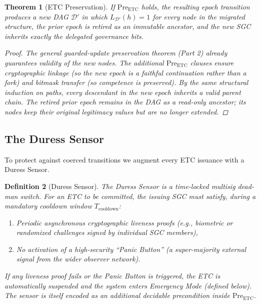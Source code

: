 \documentclass[11pt,a4paper]{article}
\newtheorem{theorem}{Theorem}[section]
\newtheorem{definition}[theorem]{Definition}
\begin{document}
\begin{theorem}[ETC Preservation]
If \(\text{Pre}_{\text{ETC}}\) holds, the resulting epoch transition produces a new DAG \(\mathcal{D}'\) in which \(L_{\mathcal{D}'}(h) = 1\) for every node in the migrated structure, the prior epoch is retired as an immutable ancestor, and the new SGC inherits exactly the delegated governance bits.

\begin{proof}
The general guarded-update preservation theorem (Part 2) already guarantees validity of the new nodes. The additional \(\text{Pre}_{\text{ETC}}\) clauses ensure cryptographic linkage (so the new epoch is a faithful continuation rather than a fork) and bitmask transfer (so competence is preserved). By the same structural induction on paths, every descendant in the new epoch inherits a valid parent chain. The retired prior epoch remains in the DAG as a read-only ancestor; its nodes keep their original legitimacy values but are no longer extended.
\end{proof}
\end{theorem}

\subsection{The Duress Sensor}

To protect against coerced transitions we augment every ETC issuance with a Duress Sensor.

\begin{definition}[Duress Sensor]
The Duress Sensor is a time-locked multisig dead-man switch. For an ETC to be committed, the issuing SGC must satisfy, during a mandatory cooldown window \(T_{\text{cooldown}}\):

\begin{enumerate}
\item Periodic asynchronous cryptographic liveness proofs (e.g., biometric or randomized challenges signed by individual SGC members),

\item No activation of a high-security ``Panic Button'' (a super-majority external signal from the wider observer network).



\end{enumerate}

If any liveness proof fails or the Panic Button is triggered, the ETC is automatically suspended and the system enters Emergency Mode (defined below). The sensor is itself encoded as an additional decidable precondition inside \(\text{Pre}_{\text{ETC}}\).
\end{definition}
\end{document}
